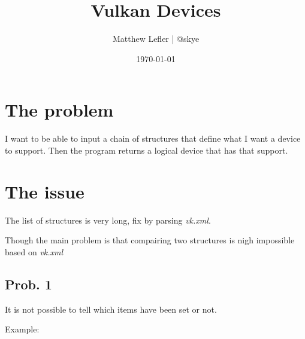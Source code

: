\documentclass{article}
\title{Vulkan Devices}
\date{\today}
\author{
    Matthew Lefler | @skye
}
\begin{document}
\maketitle
\clearpage

\section{The problem}
I want to be able to input a chain of structures 
that define what I want a device to support.
Then the program returns a logical device that has that support.

\section{The issue}
The list of structures is very long, fix by parsing \textit{vk.xml}.

Though the main problem is that compairing two structures is nigh
impossible based on \textit{vk.xml}

\subsection{Prob. 1}
It is not possible to tell which items have been set or not.

Example: 
\end{document}
